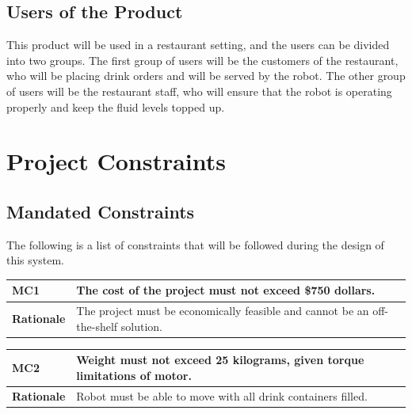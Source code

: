 \documentclass [11pt]{article}
\begin{document}
\subsection{Users of the Product} 
This product will be used in a restaurant setting, and the users can be divided into two groups. The first group of users will be the customers of the restaurant, who will be placing drink orders and will be served by the robot. The other group of users will be the restaurant staff, who will ensure that the robot is operating properly and keep the fluid levels topped up.



\section{\textbf{Project Constraints}}

\subsection{Mandated Constraints}
The following is a list of constraints that will be followed during the design of this system.

\begin{longtable}{| p{ } | p{ } | }\hline 
\rowcolor{tableCell}\textbf{MC1} & \textbf{The cost of the project must not exceed \$750 dollars.} \\ \hline
\textbf{Rationale} & The project must be economically feasible and cannot be an off-the-shelf solution.\\ \hline 
\end{longtable}

\begin{longtable}{| p{ } | p{ } | }\hline 
\rowcolor{tableCell}\textbf{MC2}& \textbf{Weight must not exceed 25 kilograms, given torque limitations of motor.}\\ \hline 
\textbf{Rationale} & Robot must be able to move with all drink containers filled.\\ \hline 
\end{longtable}
\end{document}
